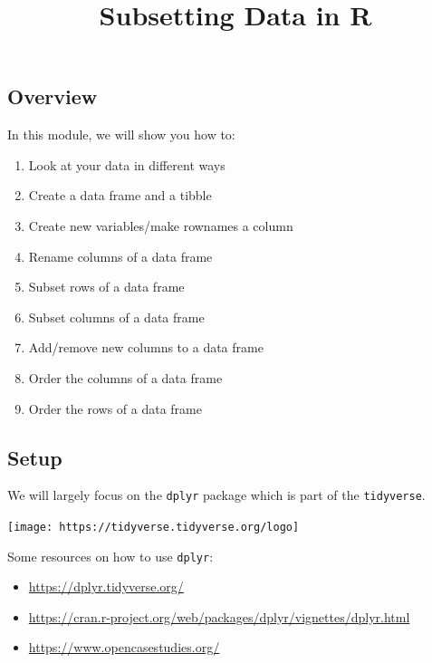 \documentclass[
]{article}
\title{Subsetting Data in R}
\author{}
\date{\vspace{-2.5em}}
\providecommand{\tightlist}{%
  \setlength{\itemsep}{0pt}\setlength{\parskip}{0pt}}
\begin{document}
\maketitle

\hypertarget{overview}{%
\subsection{Overview}\label{overview}}

In this module, we will show you how to:

\begin{enumerate}
\def\labelenumi{\arabic{enumi}.}
\tightlist
\item
  Look at your data in different ways
\item
  Create a data frame and a tibble
\item
  Create new variables/make rownames a column
\item
  Rename columns of a data frame
\item
  Subset rows of a data frame
\item
  Subset columns of a data frame
\item
  Add/remove new columns to a data frame
\item
  Order the columns of a data frame
\item
  Order the rows of a data frame
\end{enumerate}

\hypertarget{setup}{%
\subsection{Setup}\label{setup}}

We will largely focus on the \texttt{dplyr} package which is part of the
\texttt{tidyverse}.

\begin{center}\texttt{[image: https://tidyverse.tidyverse.org/logo]} \end{center}

Some resources on how to use \texttt{dplyr}:

\begin{itemize}
\tightlist
\item
  \url{https://dplyr.tidyverse.org/}
\item
  \url{https://cran.r-project.org/web/packages/dplyr/vignettes/dplyr.html}
\item
  \url{https://www.opencasestudies.org/}
\end{itemize}
\end{document}
